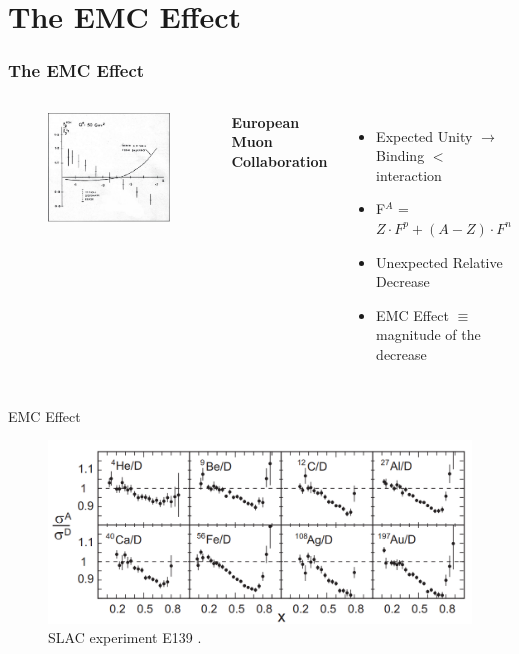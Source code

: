 \documentclass[12pt]{beamer}
\begin{document}
\section[EMC]{The EMC Effect}

\begin{frame}
\frametitle{The EMC Effect}
\begin{columns}[t]
	\vspace{-35pt}
	\begin{figure}
		\includegraphics[width =7cm]{../images/Thesis/EMC.png}
		\caption*{}
	\end{figure}
	\centering
	\textbf{ European Muon Collaboration}
	\begin{itemize}
		\item Expected Unity $\rightarrow$ Binding $<$ interaction
		\item F$^A$ = $Z \cdot F^p + (A-Z)\cdot F^n$  
		\item Unexpected Relative Decrease
		\item EMC Effect $\equiv$ magnitude of the decrease
	\end{itemize}
	
\end{columns}
\end{frame}



\begin{frame}{EMC Effect}

\begin{figure}
\caption*{\label{EMC_slac} SLAC experiment E139 \cite{slac_emc} .}
\includegraphics[width =12cm]{../images/EMC_slac_horiz.png}
\end{figure}


\end{frame}
\end{document}
